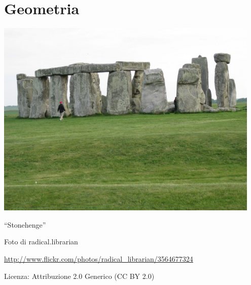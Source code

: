 
\part{Geometria}

\includegraphics[width=0.95\textwidth]{img/Stonehenge.jpg}
  \begin{center}
    {\large ``Stonehenge''}\par
    Foto di radical.librarian\par
    \url{http://www.flickr.com/photos/radical_librarian/3564677324}\par
    Licenza: Attribuzione 2.0 Generico (CC BY 2.0)\par
  \end{center}
\clearpage
\cleardoublepage
